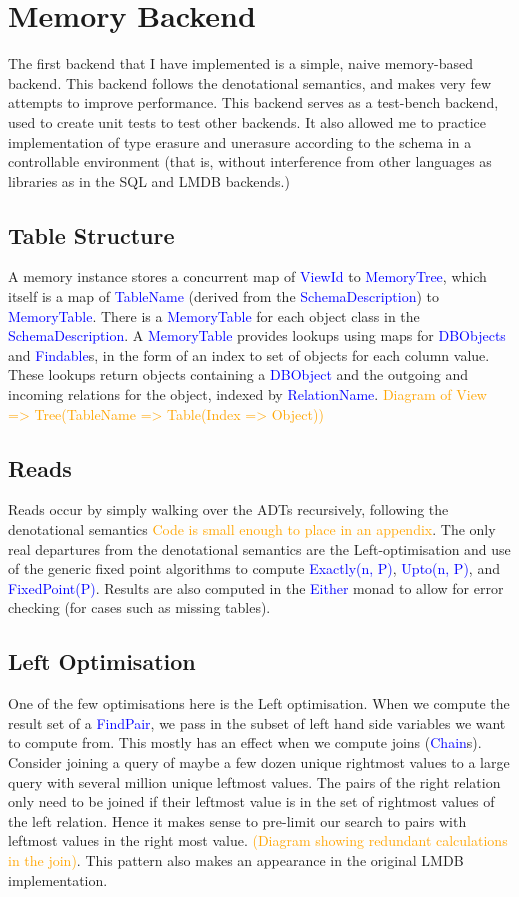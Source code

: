 \documentclass[12pt,a4paper,twoside,openright]{report}
\newcommand\codeName[1]{\textcolor{blue}{#1}}
\newcommand\diagramNeeded[1]{\textcolor{orange}{#1}}
\begin{document}
{{\section{Memory Backend}
The first backend that I have implemented is a simple, naive memory-based backend. This backend follows the denotational semantics, and makes very few attempts to improve performance. This backend serves as a test-bench backend, used to create unit tests to test other backends. It also allowed me to practice implementation of type erasure and unerasure according to the schema in a controllable environment (that is, without interference from other languages as libraries as in the SQL and LMDB backends.)
	\subsection{Table Structure}
	A memory instance stores a concurrent map of \codeName{ViewId} to \codeName{MemoryTree}, which itself is a map of \codeName{TableName} (derived from the \codeName{SchemaDescription}) to \codeName{MemoryTable}. There is a \codeName{MemoryTable} for each object class in the \codeName{SchemaDescription}. A \codeName{MemoryTable} provides lookups using maps for \codeName{DBObjects} and \codeName{Findable}s, in the form of an index to set of objects for each column value. These lookups return objects containing a \codeName{DBObject} and the outgoing and incoming relations for the object, indexed by \codeName{RelationName}. 
	\diagramNeeded{Diagram of View => Tree(TableName => Table(Index => Object)) }

	
	\subsection{Reads}
Reads occur by simply walking over the ADTs recursively, following the denotational semantics \diagramNeeded{Code is small enough to place in an appendix}. The only real departures from the denotational semantics are the Left-optimisation and use of the generic fixed point algorithms to compute \codeName{Exactly(n, P)}, \codeName{Upto(n, P)}, and \codeName{FixedPoint(P)}. Results are also computed in the \codeName{Either} monad to allow for error checking (for cases such as missing tables).
	
	\subsection{Left Optimisation}
	One of the few optimisations here is the Left optimisation. When we compute the result set of a \codeName{FindPair}, we pass in the subset of left hand side variables we want to compute from. This mostly has an effect when we compute joins (\codeName{Chain}s). Consider joining a query of maybe a few dozen unique rightmost values to a large query with several million unique leftmost values. The pairs of the right relation only need to be joined if their leftmost value is in the set of rightmost values of the left relation. Hence it makes sense to pre-limit our search to pairs with leftmost values in the right most value. \diagramNeeded{(Diagram showing redundant calculations in the join)}. This pattern also makes an appearance in the original LMDB implementation.
}}
\end{document}
